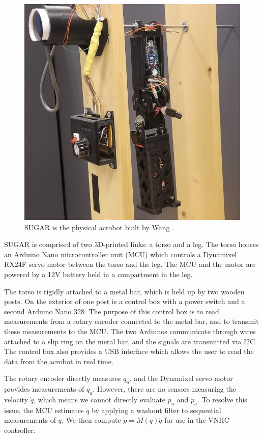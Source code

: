 \documentclass[journal,twoside,web, onecolumn, draftcls]{ieeecolor}
\begin{document}
\begin{figure}
    \centering
    \includegraphics[width=0.9\linewidth]{xingbo_acrobot.jpg}
    \caption{SUGAR is the physical acrobot built by Wang \cite{xingbo_thesis}.}
    \label{fig:xingbo-acrobot}
\end{figure}

SUGAR is comprised of two 3D-printed links: a torso and a leg.
The torso houses an Arduino Nano microcontroller unit (MCU) which controls
a Dynamixel RX24F servo motor between the torso and the leg.
The MCU and the motor are powered by a 12V battery held in a compartment
in the leg.

The torso is rigidly attached to a metal bar, which is held up by two wooden
posts.
On the exterior of one post is a control box with a power switch and a second
Arduino Nano 328.
The purpose of this control box is to read measurements from a rotary
encoder connected to the metal bar, and to transmit these measurements to the
MCU.
The two Arduinos communicate through wires attached to a slip ring on the metal
bar, and the signals are transmitted via I2C.
The control box also provides a USB interface which allows the user to read the
data from the acrobot in real time.

The rotary encoder directly measures \(q_u\), and the Dynamixel servo
motor provides measurements of \(q_a\).
However, there are no sensors measuring the velocity \(\dot{q}\), which means we cannot
directly evaluate \(p_u\) and \(p_a\).
To resolve this issue, the MCU estimates \(\dot{q}\) by applying a washout
filter to sequential measurements of \(q\).
We then compute \(p = M(q)\dot{q}\) for use in the VNHC controller.
\end{document}
